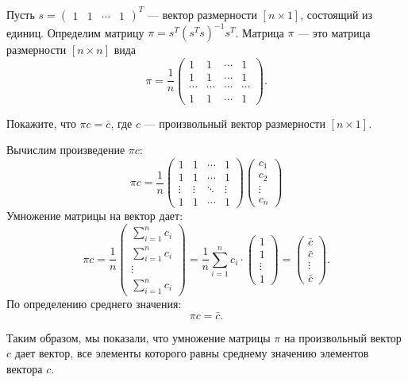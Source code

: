 \documentclass[12pt]{article}
\begin{document}
\begin{problem}
Пусть 
$s = 
 \begin{pmatrix}
  1 & 1 & \cdots & 1
 \end{pmatrix}^{T}$ — вектор размерности $[n \times 1]$, состоящий из единиц.
Определим матрицу $\pi = s^{T}(s^{T}s)^{-1}s^{T}$. Матрица $\pi$ — это матрица размерности $[n \times n]$ вида
\[
\pi = \frac{1}{n}
 \begin{pmatrix}
  1 & 1 & \cdots & 1\\
  1 & 1 & \cdots & 1\\
  \cdots & \cdots & \cdots & \cdots \\
  1 & 1 & \cdots & 1
 \end{pmatrix}.
 \]
 
Покажите, что $\pi c = \bar c$, где $c$ — произвольный вектор размерности $[n \times 1]$.
\end{problem}

\begin{sol}

Вычислим произведение $\pi c$:
\[
\pi c = \frac{1}{n} 
\begin{pmatrix} 
1 & 1 & \cdots & 1 \\
1 & 1 & \cdots & 1 \\
\vdots & \vdots & \ddots & \vdots \\
1 & 1 & \cdots & 1 
\end{pmatrix}
\begin{pmatrix} c_1 \\ c_2 \\ \vdots \\ c_n \end{pmatrix}
\]
Умножение матрицы на вектор дает:
\[
\pi c = \frac{1}{n} 
\begin{pmatrix} 
\sum_{i=1}^n c_i \\
\sum_{i=1}^n c_i \\
\vdots \\
\sum_{i=1}^n c_i 
\end{pmatrix}
= \frac{1}{n} \sum_{i=1}^n c_i \cdot 
\begin{pmatrix} 1 \\ 1 \\ \vdots \\ 1 \end{pmatrix} = 
\begin{pmatrix} \bar{c} \\ \bar{c} \\ \vdots \\ \bar{c} \end{pmatrix}.
\]
По определению среднего значения:
\[
\pi c = \bar{c}.
\]

Таким образом, мы показали, что умножение матрицы $\pi$ на произвольный вектор $c$ дает вектор, все элементы которого равны среднему значению элементов вектора $c$.
\end{sol}
\end{document}
